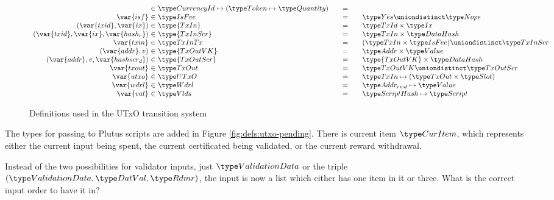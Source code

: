 \begin{figure*}[htb]
\begin{equation*}
\begin{array}{r@{~\in~}l@{\qquad=\qquad}lr}
      & \CurrencyId \mapsto (\Token \mapsto \Quantity)
      \\
      \var{isf}
      & \IsFee
      & \Yes \uniondistinct \Nope
      \\
      (\var{txid}, \var{ix})
      & \type{TxIn}
      & \TxId \times \Ix
      \\
      (\var{txid}, \var{ix}, \var{hash_r})
      & \type{TxInScr}
      & \TxIn \times \HashDat
      \\
      \var{txin}
      & \TxInTx
      & (\TxIn \times \IsFee) \uniondistinct \TxInScr
      \\
      (\var{addr}, v)
      & \type{TxOutVK}
      & \Addr \times \Value
      \\
      (\var{addr}, v, \var{hashscr_d})
      & \type{TxOutScr}
      & \type{TxOutVK} \times \HashDat
      \\
      \var{txout}
      & \TxOut
      & \TxOutVK \uniondistinct \TxOutScr
      \\
      \var{utxo}
      & \UTxO
      & \TxIn \mapsto (\TxOut \times \Slot)
      \\
      \var{wdrl}
      & \Wdrl
      & \AddrRWD \mapsto \Value
      \\
      \var{val}
      & \Vlds
      & \HashScr \mapsto \Script
    \end{array}
  \end{equation*}
  \caption{Definitions used in the UTxO transition system}
  \label{fig:defs:utxo-shelley-1}
\end{figure*}

The types for passing to Plutus scripts are added in Figure \ref{fig:defs:utxo-pending}.
There is current item $\CurItem$, which represents either the current input being
spent, the current certificated being validated, or the current reward
withdrawal.

\begin{note}
Instead of the two possibilities for validator inputs, just $\ValidationData$ or
the triple $(\ValidationData, \DatVal, \Rdmr)$, the input is now a list which
either has one item in it or three. What is the correct input order to have
it in?
\end{note}


